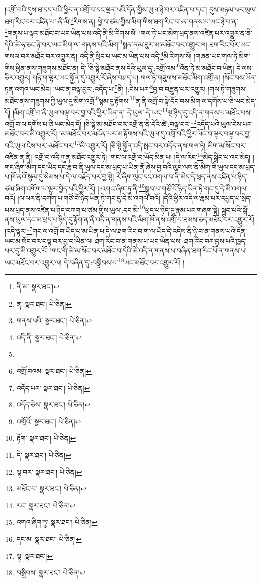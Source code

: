 །འགྲོ་བའི་དུས་ཐ་དད་པའི་ཕྱིར་ན་འགྲོ་བ་དང་ལྡན་པའི་དོན་གྱིས་ཡུལ་ཉེ་བར་འཛིན་པ་དང་། དུས་མཉམ་པར་ཡུལ་ཐག་རིང་བར་འཛིན་པ་:ནི་མི་\footnote{ནི་མ་  སྣར་ཐང་། }རིགས་ན། ཕྱེ་བ་ཙམ་གྱིས་མིག་གིས་ཐག་རིང་བ་:ན་གནས་པ་ཡང་ཉེ་བ་ན་\footnote{ན་  སྣར་ཐང་།  པེ་ཅིན། }གནས་པ་ལྟར་མཐོང་བ་ཡང་ཡིན་པས་འདི་ནི་མི་རིགས་སོ། །གལ་ཏེ་ཡང་མིག་ཕྲད་ནས་འཛིན་པར་འགྱུར་ན་ནི་དེའི་ཚེ་ཧ་ཅང་ཉེ་བར་ཡང་མིག་ལ་:གནས་པའི་མིག་\footnote{གནས་པའི་  སྣར་ཐང་།  པེ་ཅིན། }སྨན་ནམ་ཐུར་མ་མཐོང་བར་འགྱུར་ལ། ཐག་རིང་པོར་ཡང་གསལ་བར་མཐོང་བར་འགྱུར་ན། འདི་ནི་སྲིད་པ་ཡང་མ་ཡིན་པས་འདི་\footnote{འདི་ནི་  སྣར་ཐང་།  པེ་ཅིན། }མི་རིགས་སོ། །གཞན་ཡང་གལ་ཏེ་མིག་གིས་ཕྱིན་ནས་གཟུགས་མཐོང་ན། དེ་\footnote{}ཅི་སྟེ་མཐོང་ནས་དེའི་ཡུལ་དུ་:འགྲོ་འམ་\footnote{འགྲོ་བའམ་  སྣར་ཐང་།  པེ་ཅིན། }འོན་ཏེ་མ་མཐོང་བ་ཡིན། དེ་ལས་ཅིར་འགྱུར། གཉི་ག་ལྟར་ཡང་སྐྱོན་དུ་འགྱུར་རོ་ཞེས་བཤད་པ། གལ་ཏེ་གཟུགས་མཐོང་མིག་འགྲོ་ན། །སོང་བས་ཡོན་ཏན་འགའ་ཡང་མེད། །ཡང་ན་བལྟ་བྱར་:འདོད་པ་\footnote{འདོད་པར་  སྣར་ཐང་།  པེ་ཅིན། }ནི། །:ངེས་པར་\footnote{འདོད་ཅེས་  སྣར་ཐང་།  པེ་ཅིན། }བྱ་བ་བརྫུན་པར་འགྱུར། །གལ་ཏེ་གཟུགས་མཐོང་ནས་གཟུགས་ཀྱི་ཡུལ་དུ་མིག་འགྲོ་\footnote{འགྲོའོ་  སྣར་ཐང་།  པེ་ཅིན། }སྙམ་དུ་རྟོགས་\footnote{རྟོག་  སྣར་ཐང་།  པེ་ཅིན། }ན་ནི་འགྲོ་བ་སྟེ་དོང་བས་མིག་ལ་དགོས་པ་ཅི་ཡང་མེད་དོ། །མིག་འགྲོ་བ་ནི་ཡུལ་བལྟ་བར་བྱ་བའི་ཕྱིར་ཡིན་ན། དེ་ཡུལ་:དེ་ཡང་\footnote{དེ་  སྣར་ཐང་།  པེ་ཅིན། }སྔ་ཉིད་དུ་འདི་ན་གནས་པ་མཐོང་བས་འགྲོ་བ་ལ་དགོས་པ་ཅི་ཡང་མེད་དོ། །ཅི་སྟེ་མ་མཐོང་བར་འགྲོ་ན་ནི་དེའི་ཚེ་:བལྟ་བར་\footnote{ལྟ་བར་  སྣར་ཐང་།  པེ་ཅིན། }འདོད་པའི་ཡུལ་ངེས་པར་མཐོང་བར་མི་འགྱུར་རོ། །མ་མཐོང་བར་མངོན་པར་མ་རྟོགས་པའི་ཡུལ་དུ་འགྲོ་བའི་ཕྱིར་ལོང་བ་ལྟར་བལྟ་བར་བྱ་བའི་ཡུལ་ངེས་པར་:མཐོང་བར་\footnote{མཐོང་བ་  སྣར་ཐང་།  པེ་ཅིན། }མི་འགྱུར་རོ། །ཅི་སྟེ་སྐྱོན་འདི་སྤང་བར་འདོད་ནས་གལ་ཏེ། མིག་མ་སོང་བར་འཛིན་ན་ནི། འགྲོ་བ་འདི་ཀུན་མཐོང་འགྱུར་ཏེ། །གང་ལ་འགྲོ་བ་ཡོད་མིན་པ། །དེ་ལ་རིང་\footnote{རང་  སྣར་ཐང་།  པེ་ཅིན། }མེད་སྒྲིབ་པ་འང་མེད། །གང་ཞིག་མིག་དང་ཡིད་དང་རྣ་བ་ནི་ཡུལ་དང་མ་ཕྲད་པ་ཡིན་ནོ་ཞེས་བྱ་བའི་ལུང་ལས་ནི་མིག་གི་ཡུལ་དང་མ་ཕྲད་པ་ཁོ་ནའོ་སྙམ་དུ་སེམས་པ་དེ་ལ་བརྗོད་པར་བྱ་སྟེ། རེ་ཞིག་ལུང་དང་འགལ་བ་ནི་མེད་དེ་ཕྲད་ནས་འཛིན་པ་ཉིད་ཙམ་ཞིག་འགོག་པ་ལྷུར་བྱེད་པའི་ཕྱིར་རོ། །:འགའ་ཞིག་ཏུ་ནི་\footnote{འགའ་ཞིག་ཏུ་  སྣར་ཐང་།  པེ་ཅིན། }སྒྲུབ་པ་གཙོ་བོ་ཉིད་ཡིན་ཏེ་གང་དུ་དེ་མི་འགལ་བའོ། །ལ་ལར་ནི་དགག་པ་གཙོ་བོ་ཉིད་ཡིན་ཏེ་གང་དུ་དེ་མི་འགལ་བའོ། །དེའི་ཕྱིར་འདི་ལ་རྣམ་པར་དཔྱད་པ་སྲིད་པས་ཕྲད་ནས་འཛིན་པ་ཉིད་བཀག་པ་ཙམ་གྱིས་ཡུལ་:དང་མི་\footnote{དང་མ་  སྣར་ཐང་།  པེ་ཅིན། }ཕྲད་པ་ཉིད་དུ་རྣམ་པར་གཞག་སྟེ། སྒྲུབ་པའི་སྒོ་ནས་ཡུལ་དང་མ་ཕྲད་པ་ཉིད་དུ་རྟོག་ན་ནི་འདི་ན་གནས་པའི་མིག་ཁོ་ནས་འགྲོ་བ་ཐམས་ཅད་མཐོང་བར་འགྱུར་རོ། །འདི་ལྟར་\footnote{ལྟ་  སྣར་ཐང་། }གང་ལ་འགྲོ་བ་ཡོད་པ་མ་ཡིན་པ་དེ་ལ་ཐག་རིང་བ་ག་ལ་ཡོད་དེ་འདིས་ནི་ཉེ་བ་ན་གནས་པའི་དོན་ཡང་མ་སོང་བར་བལྟ་བར་བྱ་བ་ཡིན་ལ། ཐག་རིང་བ་ན་གནས་པ་ཡང་ཡིན་པས། ཐག་རིང་བར་བྱས་པའི་ཁྱད་པར་དུ་མི་འགྱུར་རོ། །གང་གི་ཚེ་མ་སོང་བར་མཐོང་བ་དེའི་ཚེ་འདི་ན་གནས་པ་བཞིན་ཐག་རིང་པོ་ན་གནས་པ་ཡང་མཐོང་བར་འགྱུར་ལ། དེ་བཞིན་དུ་:བསྒྲིབས་པ་\footnote{བསྒྲིབས་  སྣར་ཐང་།  པེ་ཅིན། }ཡང་མཐོང་བར་འགྱུར་རོ། །
